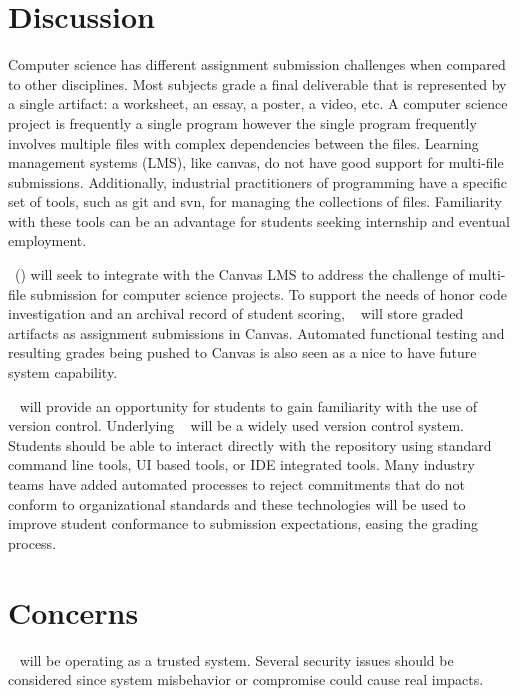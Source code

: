 %
%

\section{Discussion}
Computer science has different assignment submission challenges when compared to other disciplines.
Most subjects grade a final deliverable that is represented by a single artifact: a worksheet, an essay, a poster, a video, etc.
A computer science project is frequently a single program however the single program frequently involves multiple files with complex dependencies between the files.
Learning management systems (LMS), like canvas, do not have good support for multi-file submissions.
Additionally, industrial practitioners of programming have a specific set of tools, such as git and svn, for managing the collections of files.
Familiarity with these tools can be an advantage for students seeking internship and eventual employment.

\longname~(\acronym) will seek to integrate with the Canvas LMS to address the challenge of multi-file submission for computer science projects.
To support the needs of honor code investigation and an archival record of student scoring, \acronym~ will store graded artifacts as assignment submissions in Canvas.
Automated functional testing and resulting grades being pushed to Canvas is also seen as a nice to have future system capability.

\acronym~ will provide an opportunity for students to gain familiarity with the use of version control.
Underlying \acronym~ will be a widely used version control system.
Students should be able to interact directly with the repository using standard command line tools, UI based tools, or IDE integrated tools.
Many industry teams have added automated processes to reject commitments that do not conform to organizational standards and these technologies will be used to improve student conformance to submission expectations, easing the grading process.

\section{Concerns}
\acronym~ will be operating as a trusted system.
Several security issues should be considered since system misbehavior or compromise could cause real impacts.

